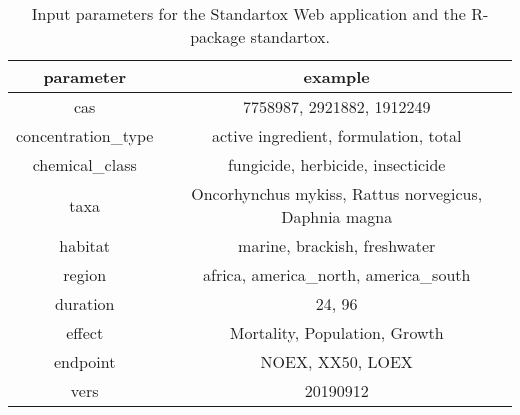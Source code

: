 \begin{table}[ht]
  \caption{Input parameters for the Standartox Web application and the R-package standartox.}
  \label{tab:app-parameters}
  \centering
\begin{tabular}{cc}
  \hline
  parameter & example \\ 
  \hline
  cas & 7758987, 2921882, 1912249   \\[0.5cm]
  concentration\_type & active ingredient, formulation, total   \\[0.5cm]
  chemical\_class & fungicide, herbicide, insecticide   \\[0.5cm]
  taxa & Oncorhynchus mykiss, Rattus norvegicus, Daphnia magna   \\[0.5cm]
  habitat & marine, brackish, freshwater   \\[0.5cm]
  region & africa, america\_north, america\_south   \\[0.5cm]
  duration & 24, 96   \\[0.5cm]
  effect & Mortality, Population, Growth   \\[0.5cm]
  endpoint & NOEX, XX50, LOEX   \\[0.5cm]
  vers & 20190912   \\
  \hline
\end{tabular}
\end{table}

